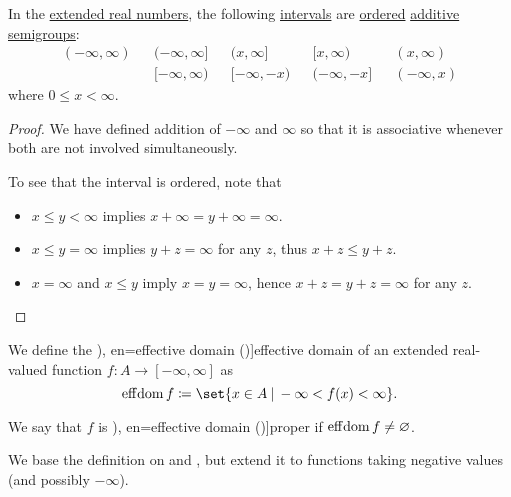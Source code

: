 \begin{proposition}\label{thm:extended_real_semigroup}
  In the \hyperref[def:extended_real_numbers]{extended real numbers}, the following \hyperref[def:order_interval/closed]{intervals} are \hyperref[def:ordered_semigroup]{ordered} \hyperref[con:additive_semigroup]{additive semigroups}:
  \begin{align*}
    (-\infty, \infty) && (-\infty, \infty] && (x, \infty]   && [x, \infty)    && (x, \infty) \\
                      && [-\infty, \infty) && [-\infty, -x) && (-\infty, -x] && (-\infty, x)
  \end{align*}
  where \( 0 \leq x < \infty \).
\end{proposition}
\begin{proof}
  We have defined addition of \( -\infty \) and \( \infty \) so that it is associative whenever both are not involved simultaneously.

  To see that the interval is ordered, note that
  \begin{itemize}
    \item \( x \leq y < \infty \) implies \( x + \infty = y + \infty = \infty \).
    \item \( x \leq y = \infty \) implies \( y + z = \infty \) for any \( z \), thus \( x + z \leq y + z \).
    \item \( x = \infty \) and \( x \leq y \) imply \( x = y = \infty \), hence \( x + z = y + z = \infty \) for any \( z \).
  \end{itemize}
\end{proof}

\begin{definition}\label{def:effective_domain}\mimprovised
  We define the \term[ru=эффективное множество (\cite[50]{ПоловинкинБалашов2007ВыпуклыйАнализ}), en=effective domain (\cite[30]{Clarke2013OptimalControl})]{effective domain} of an extended real-valued function \( f: A \to [-\infty, \infty] \) as
  \begin{equation}\label{eq:def:effective_domain}
    \eff\dom f \coloneqq \set{ x \in A \given -\infty < f(x) < \infty }.
  \end{equation}

  We say that \( f \) is \term[ru=эффективное множество (\cite[50]{ПоловинкинБалашов2007ВыпуклыйАнализ}), en=effective domain (\cite[30]{Clarke2013OptimalControl})]{proper} if \( \operatorname*{eff\negthinspace\operatorname{dom}} f \neq \varnothing \).
\end{definition}
\begin{comments}
  \item We base the definition on \cite[30]{Clarke2013OptimalControl} and \cite[50]{ПоловинкинБалашов2007ВыпуклыйАнализ}, but extend it to functions taking negative values (and possibly \( -\infty \)).
\end{comments}

